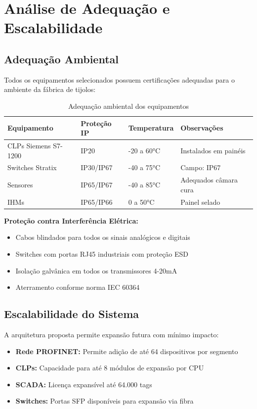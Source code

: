 \documentclass[12pt,a4paper]{article}
\begin{document}
\section{Análise de Adequação e Escalabilidade}

\subsection{Adequação Ambiental}

Todos os equipamentos selecionados possuem certificações adequadas para o ambiente da fábrica de tijolos:

\begin{table}[h]
\centering
\begin{tabular}{@{}p{4cm}|p{3cm}|p{3cm}|p{5cm}@{}}
\toprule
\textbf{Equipamento} & \textbf{Proteção IP} & \textbf{Temperatura} & \textbf{Observações} \\
\midrule
CLPs Siemens S7-1200 & IP20 & -20 a 60°C & Instalados em painéis \\
\midrule
Switches Stratix & IP30/IP67 & -40 a 75°C & Campo: IP67 \\
\midrule
Sensores & IP65/IP67 & -40 a 85°C & Adequados câmara cura \\
\midrule
IHMs & IP65/IP66 & 0 a 50°C & Painel selado \\
\bottomrule
\end{tabular}
\caption{Adequação ambiental dos equipamentos}
\end{table}

\textbf{Proteção contra Interferência Elétrica:}
\begin{itemize}
    \item Cabos blindados para todos os sinais analógicos e digitais
    \item Switches com portas RJ45 industriais com proteção ESD
    \item Isolação galvânica em todos os transmissores 4-20mA
    \item Aterramento conforme norma IEC 60364
\end{itemize}

\subsection{Escalabilidade do Sistema}

A arquitetura proposta permite expansão futura com mínimo impacto:

\begin{itemize}
    \item \textbf{Rede PROFINET:} Permite adição de até 64 dispositivos por segmento
    \item \textbf{CLPs:} Capacidade para até 8 módulos de expansão por CPU
    \item \textbf{SCADA:} Licença expansível até 64.000 tags
    \item \textbf{Switches:} Portas SFP disponíveis para expansão via fibra
\end{itemize}
\end{document}
